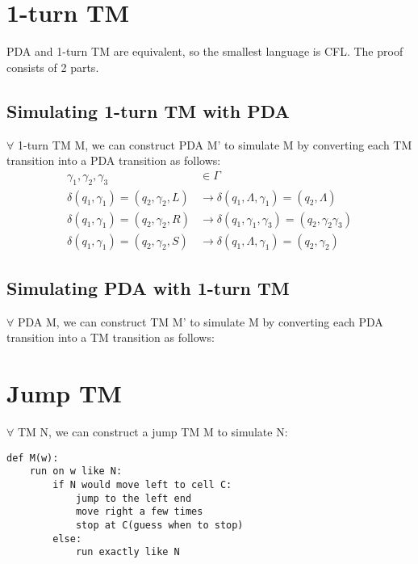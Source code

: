 \documentclass{article}
\begin{document}
\section{1-turn TM}

PDA and 1-turn TM are equivalent, so the smallest language is CFL. The proof consists of 2 parts.

\subsection{Simulating 1-turn TM with PDA}
$ \forall $ 1-turn TM M, we can construct PDA M' to simulate M by converting each TM transition into a PDA transition as follows:
\begin{align*}
\gamma_1, \gamma_2, \gamma_3 &\in \Gamma\\
\delta(q_1, \gamma_1) = (q_2, \gamma_2, L) &\to
\delta(q_1, \Lambda, \gamma_1) = (q_2, \Lambda)\\
\delta(q_1, \gamma_1) = (q_2, \gamma_2, R) &\to
\delta(q_1, \gamma_1, \gamma_3) = (q_2, \gamma_2 \gamma_3)\\
\delta(q_1, \gamma_1) = (q_2, \gamma_2, S) &\to
\delta(q_1, \Lambda, \gamma_1) = (q_2, \gamma_2)
\end{align*}

\subsection{Simulating PDA with 1-turn TM}
$ \forall $ PDA M, we can construct TM M' to simulate M by converting each PDA transition into a TM transition as follows:

\section{Jump TM}

$ \forall$ TM N, we can construct a jump TM M to simulate N:
\begin{lstlisting}
def M(w):
	run on w like N:
		if N would move left to cell C:
			jump to the left end
			move right a few times
			stop at C(guess when to stop)
		else:
			run exactly like N
\end{lstlisting}
\end{document}
